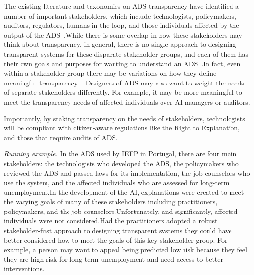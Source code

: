 The existing literature and taxonomies on ADS transparency have identified a number of important stakeholders, which include technologists, policymakers, auditors, regulators, humans-in-the-loop, and those individuals affected by the output of the ADS~\cite{DBLP:journals/corr/abs-2010-14374, meske, meyers2007street}.While there is some overlap in how these stakeholders may think about transparency, in general, there is no single approach to designing transparent systems for these disparate stakeholder groups, and each of them has their own goals and purposes for wanting to understand an ADS~\cite{DBLP:journals/corr/abs-2001-09734}.In fact, even within a stakeholder group there may be variations on how they define meaningful transparency~\cite{DBLP:conf/chi/HohmanHCDD19}. Designers of ADS may also want to weight the needs of separate stakeholders differently. For example, it may be more meaningful to meet the transparency needs of affected individuals over AI managers or auditors.

Importantly, by staking transparency on the needs of stakeholders, technologists will be compliant with citizen-aware regulations like the Right to Explanation, and those that require audits of ADS.

\emph{Running example.} In the ADS used by IEFP in Portugal, there are four main stakeholders: the technologists who developed the ADS, the policymakers who reviewed the ADS and passed laws for its implementation, the job counselors who use the system, and the affected individuals who are assessed for long-term unemployment.In the development of the AI, explanations were created to meet the varying goals of many of these stakeholders including practitioners, policymakers, and the job counselors.Unfortunately, and significantly, affected individuals were not considered.Had the practitioners adopted a robust stakeholder-first approach to designing transparent systems they could have better considered how to meet the goals of this key stakeholder group. For example, a person may want to appeal being predicted low risk because they feel they are high risk for long-term unemployment and need access to better interventions.


